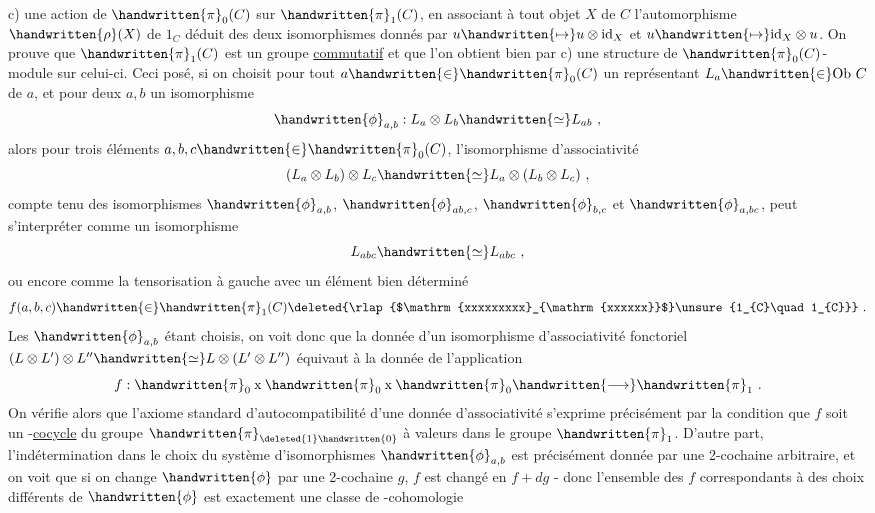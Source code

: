 c) une action de $\handwritten{\pi}_{0}(C)$ sur $\handwritten{\pi}_{1}(C)$, en associant à tout objet $X$ de $C$ l'automorphisme  $\handwritten{\rho}(X)$ de $1_C$ déduit des deux isomorphismes
donnés par $u\handwritten{\mapsto}u\otimes\mathrm{id}_{X}$ et $u\handwritten{\mapsto}\mathrm{id}_{X}\otimes u$. On prouve que $\handwritten{\pi}_{1}(C)$ est un groupe \uline{commutatif} et que l'on obtient bien par c) une structure de $\handwritten{\pi}_{0}(C)$-module sur celui-ci. Ceci posé, si on choisit pour tout $a\handwritten{\in}\handwritten{\pi}_{0}(C)$ un représentant $L_{a}\handwritten{\in}\mathrm{Ob}\ C$ de $a$, et pour deux  $a,b$ un isomorphisme
\[
\handwritten{\phi}_{a,b}: L_a\otimes L_b\handwritten{\simeq}L_{ab}\ ,
\]
alors pour trois éléments $a,b,c\handwritten{\in}\handwritten{\pi}_{0}(C)$, l'isomorphisme d'associativité
\[
(L_a\otimes L_b)\otimes L_c\handwritten{\simeq}L_a\otimes(L_b\otimes L_c)\ ,
\]
compte tenu des isomorphismes $\handwritten{\phi}_{a,b}$, $\handwritten{\phi}_{ab,c}$, $\handwritten{\phi}_{b,c}$ et $\handwritten{\phi}_{a,bc}$, peut s'interpréter comme un isomorphisme
\[
L_{abc}\handwritten{\simeq}L_{abc}\ ,
\]
ou encore comme la tensorisation à gauche avec un élément bien déterminé
\[
f(a,b,c)\handwritten{\in}\handwritten{\pi}_{1}(C)\deleted{\rlap{$\mathrm{xxxxxxxxx}_{\mathrm{xxxxxx}}$}\unsure{1_{C}\quad 1_{C}}}\ .
\]
Les $\handwritten{\phi}_{a,b}$ étant choisis, on voit donc que la donnée d'un isomorphisme d'associativité fonctoriel $(L\otimes L')\otimes L''\handwritten{\simeq}L\otimes(L'\otimes L'')$ équivaut à la donnée de l'application
\[
f:\handwritten{\pi}_{0}\mathbin{\mathrm{x}}\handwritten{\pi}_{0}\mathbin{\mathrm{x}}\handwritten{\pi}_{0}\handwritten{\longrightarrow}\handwritten{\pi}_{1}\ .
\]
On vérifie alors que l'axiome  standard d'autocompatibilité d'une donnée d'associativité  s'exprime précisément par la condition que $f$ soit un -\uline{cocycle} du groupe $\handwritten{\pi}_{\deleted{1}\handwritten{0}}$ à valeurs dans le groupe $\handwritten{\pi}_{1}$. D'autre part, l'indétermination dans le choix du système d'isomorphismes $\handwritten{\phi}_{a,b}$ est précisément donnée par une 2-cochaine arbitraire, et on voit que si on change $\handwritten{\phi}$ par une 2-cochaine $g$, $f$ est changé en $f+dg$ - donc l'ensemble des $f$ correspondants à des choix différents de $\handwritten{\phi}$ est exactement une classe de -cohomologie


